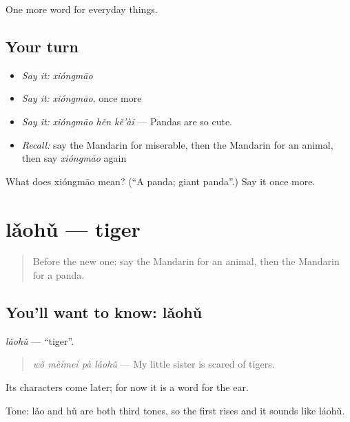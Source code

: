 \begin{grammarlens}[title={What you've built}]
One more word for everyday things.
\end{grammarlens}

\subsection*{Your turn}
\begin{itemize}
\raggedright
  \item \emph{Say it:} \emph{xióngmāo}
  \item \emph{Say it:} \emph{xióngmāo}, once more
  \item \emph{Say it:} \emph{xióngmāo hěn kě'ài} — Pandas are so cute.
  \item \emph{Recall:} say the Mandarin for miserable, then the Mandarin for an animal, then say \emph{xióngmāo} again
\end{itemize}

\begin{tcolorbox}[breakable,colback=teal!4,colframe=teal!35!black,title={Before you move on}]
What does xióngmāo mean? (\textquotedblleft{}A panda; giant panda\textquotedblright{}.) Say it once more.
\end{tcolorbox}
\section[lǎohǔ]{lǎohǔ — tiger}

\label{lesson:ZH-C223-laohu}



\begin{quote}
Before the new one: say the Mandarin for an animal, then the Mandarin for a panda.
\end{quote}

\subsection*{You'll want to know: lǎohǔ}
\emph{lǎohǔ} — \textquotedblleft{}tiger\textquotedblright{}.

\begin{quote}
\emph{wǒ mèimei pà lǎohǔ} — My little sister is scared of tigers.
\end{quote}

Its characters come later; for now it is a word for the ear.

Tone: lǎo and hǔ are both third tones, so the first rises and it sounds like láohǔ.

